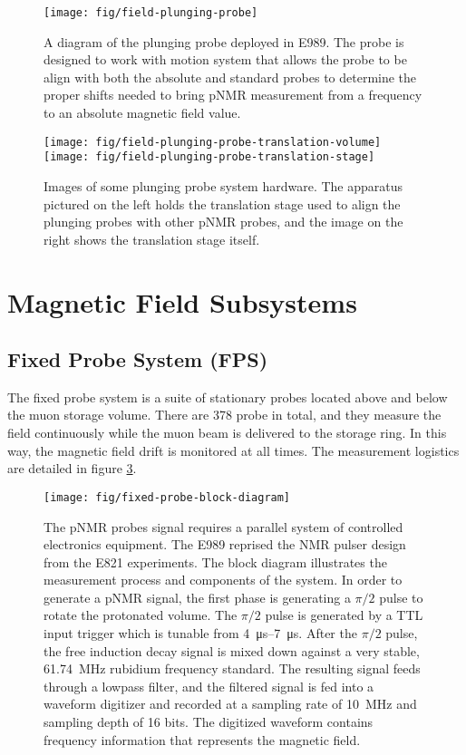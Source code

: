 \begin{figure}
\label{fig:field-plunging-probe}
\centering
\texttt{[image: fig/field-plunging-probe]}
\caption{A diagram of the plunging probe deployed in E989.  The probe is designed to work with motion system that allows the probe to be align with both the absolute and standard probes to determine the proper shifts needed to bring pNMR measurement from a frequency to an absolute magnetic field value.}
\end{figure}

\begin{figure}
\label{fig:field-plunging-probe-translation-stage}
\centering
\texttt{[image: fig/field-plunging-probe-translation-volume]}
\texttt{[image: fig/field-plunging-probe-translation-stage]}
\caption{Images of some plunging probe system hardware.  The apparatus pictured on the left holds the translation stage used to align the plunging probes with other pNMR probes, and the image on the right shows the translation stage itself.}
\end{figure}

\section{Magnetic Field Subsystems} \label{sec:field-subsystems}

\subsection{Fixed Probe System (FPS)}

The fixed probe system is a suite of stationary probes located above and below the muon storage volume.  There are 378 probe in total, and they measure the field continuously while the muon beam is delivered to the storage ring.  In this way, the magnetic field drift is monitored at all times.  The measurement logistics are detailed in figure \ref{fig:fixed-probe-block-diagram}.

\begin{figure}
\label{fig:fixed-probe-block-diagram}
\centering
\texttt{[image: fig/fixed-probe-block-diagram]}
\caption{The pNMR probes signal requires a parallel system of controlled electronics equipment.  The E989 reprised the NMR pulser design from the E821 experiments. The block diagram illustrates the measurement process and components of the system.  In order to generate a pNMR signal, the first phase is generating a $\pi/2$ pulse to rotate the protonated volume.  The $\pi/2$ pulse is generated by a TTL input trigger which is tunable from \SIrange{4}{7}{\micro\second}.  After the $\pi/2$ pulse, the free induction decay signal is mixed down against a very stable, \SI{61.74}{\MHz} rubidium frequency standard.  The resulting signal feeds through a lowpass filter, and the filtered signal is fed into a waveform digitizer and recorded at a sampling rate of \SI{10}{\MHz} and sampling depth of 16 bits.  The digitized waveform contains frequency information that represents the magnetic field.}
\end{figure}

